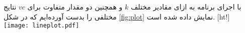 

با اجرای برنامه به ازای مقادیر مختلف $k$ و همچنین دو مقدار متفاوت برای $vc$ نتایج مختلفی را بدست آورده‌ایم که در شکل \ref{fig:plot} نمایش داده شده است.
[ht!]
 \centering
\texttt{[image: lineplot.pdf]}
\label{fig:plot}


